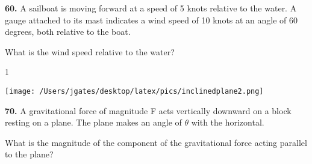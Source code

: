 {\bf \Large{60.}} A sailboat is moving forward at a speed of 5 knots relative to the water. A gauge attached to its mast indicates a wind speed of 10 knots at an angle of 60 degrees, both relative to the boat. 
\bigskip

\indent What is the wind speed relative to the water?

\bigskip
\vspace{20mm}%

\AddToShipoutPicture*{\BackgroundPic}

\addtocounter {ProbNum} {1}

\begin{floatingfigure}[r]{.25\textwidth}
\texttt{[image: /Users/jgates/desktop/latex/pics/inclinedplane2.png]}
\end{floatingfigure}
 
{\bf \Large{70.}} A gravitational force of magnitude F acts vertically downward on a block resting on a plane. The plane makes an angle of $\theta$ with the horizontal. 

\bigskip

\indent What is the magnitude of the component of the gravitational force acting parallel to the plane? 

\bigskip
\vspace{20mm}